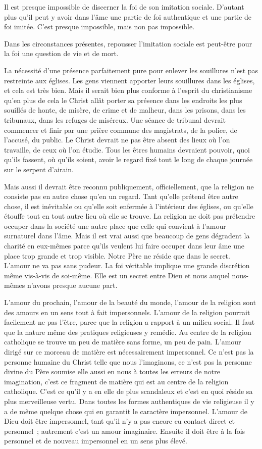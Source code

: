 \documentclass[french,twoside]{book} %
\begin{document}
Il est presque impossible de discerner la foi de son imitation sociale. D'autant plus qu'il peut y avoir dans l'âme une partie de foi authentique et une partie de foi imitée. C'est presque impossible, mais non pas impossible.\par
Dans les circonstances présentes, repousser l'imitation sociale est peut-être pour la foi une question de vie et de mort.\par
La nécessité d'une présence parfaitement pure pour enlever les souillures n'est pas restreinte aux églises. Les gens viennent apporter leurs souillures dans les églises, et cela est très bien. Mais il serait bien plus conforme à l'esprit du christianisme qu'en plus de cela le Christ allât porter sa présence dans les endroits les plus souillés de honte, de misère, de crime et de malheur, dans les prisons, dans les tribunaux, dans les refuges de miséreux. Une séance de tribunal devrait commencer et finir par une prière commune des magistrats, de la police, de l'accusé, du public. Le Christ devrait ne pas être absent des lieux où l'on travaille, de ceux où l'on étudie. Tous les êtres humains devraient pouvoir, quoi qu'ils fassent, où qu'ils soient, avoir le regard fixé tout le long de chaque journée sur le serpent d'airain.\par
Mais aussi il devrait être reconnu publiquement, officiellement, que la religion ne consiste pas en autre chose qu'en un regard. Tant qu'elle prétend être autre chose, il est inévitable ou qu'elle soit enfermée à l'intérieur des églises, ou qu'elle étouffe tout en tout autre lieu où elle se trouve. La religion ne doit pas prétendre occuper dans la société une autre place que celle qui convient à l'amour surnaturel dans l'âme. Mais il est vrai aussi que beaucoup de gens dégradent la charité en eux-mêmes parce qu'ils veulent lui faire occuper dans leur âme une place trop grande et trop visible. Notre Père ne réside que dans le secret. L'amour ne va pas sans pudeur. La foi véritable implique une grande discrétion même vis-à-vis de soi-même. Elle est un secret entre Dieu et nous auquel nous-mêmes n'avons presque aucune part.\par
L'amour du prochain, l'amour de la beauté du monde, l'amour de la religion sont des amours en un sens tout à fait impersonnels. L'amour de la religion pourrait facilement ne pas l'être, parce que la religion a rapport à un milieu social. Il faut que la nature même des pratiques religieuses y remédie. Au centre de la religion catholique se trouve un peu de matière sans forme, un peu de pain. L'amour dirigé sur ce morceau de matière est nécessairement impersonnel. Ce n'est pas la personne humaine du Christ telle que nous l'imaginons, ce n'est pas la personne divine du Père soumise elle aussi en nous à toutes les erreurs de notre imagination, c'est ce fragment de matière qui est au centre de la religion catholique. C'est ce qu'il y a en elle de plus scandaleux et c'est en quoi réside sa plus merveilleuse vertu. Dans toutes les formes authentiques de vie religieuse il y a de même quelque chose qui en garantit le caractère impersonnel. L'amour de Dieu doit être impersonnel, tant qu'il n'y a pas encore eu contact direct et personnel ; autrement c'est un amour imaginaire. Ensuite il doit être à la fois personnel et de nouveau impersonnel en un sens plus élevé.
\end{document}
